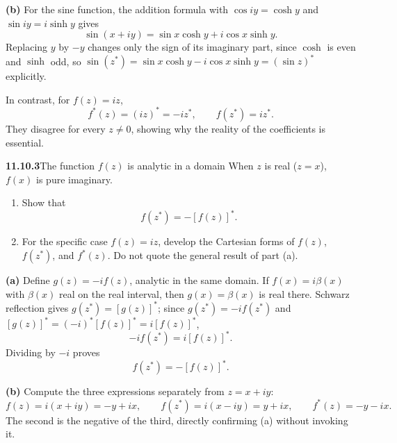 \textbf{(b)} For the sine function, the addition formula with
$\cos iy=\cosh y$ and $\sin iy=i\sinh y$ gives
\[
\sin(x+iy)=\sin x\cosh y+i\cos x\sinh y.
\]
Replacing $y$ by $-y$ changes only the sign of its imaginary part,
since $\cosh$ is even and $\sinh$ odd, so
$\sin(z^*)=\sin x\cosh y-i\cos x\sinh y=(\sin z)^*$
explicitly.

In contrast, for $f(z)=iz$,
\[
f^*(z)=(iz)^*=-iz^*,\qquad f(z^*)=iz^*.
\]
They disagree for every $z\ne0$, showing why the reality of the
coefficients is essential.

\par\bigskip
\noindent\textbf{11.10.3}\quad The function $f(z)$ is analytic in a domain
 When $z$ is real ($z=x$), $f(x)$ is pure
imaginary.
\begin{enumerate}
\item[(a)] Show that
  \[
  f(z^{*})=-[f(z)]^{*}.
  \]
\item[(b)] For the specific case $f(z)=iz$, develop the Cartesian forms of
  $f(z)$, $f(z^{*})$, and $f^{*}(z)$. Do not quote the general result of
  part (a).
\end{enumerate}
\solution
\textbf{(a)} Define $g(z)=-if(z)$, analytic in the same domain. If
$f(x)=i\beta(x)$ with $\beta(x)$ real on the real interval, then
$g(x)=\beta(x)$ is real there. Schwarz reflection gives
$g(z^*)=[g(z)]^*$; since $g(z^*)=-if(z^*)$ and
$[g(z)]^*=(-i)^*[f(z)]^*=i[f(z)]^*$,
\[
-if(z^*)=i[f(z)]^*.
\]
Dividing by $-i$ proves
\[
\boxed{f(z^*)=-[f(z)]^*}.
\]

\textbf{(b)} Compute the three expressions separately from $z=x+iy$:
\[
f(z)=i(x+iy)=-y+ix,\qquad
f(z^*)=i(x-iy)=y+ix,\qquad
f^*(z)=-y-ix.
\]
The second is the negative of the third, directly confirming (a)
without invoking it.


